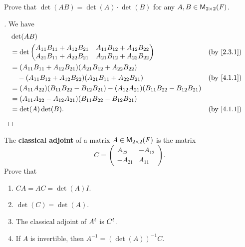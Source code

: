 \begin{ex}\label{ex:4.1.9}
	Prove that \(\det(AB) = \det(A) \cdot \det(B)\) for any \(A, B \in \mathsf{M}_{{2} \times 2}({\mathit{F}})\).
\end{ex}

\begin{proof}[]
	We have
	\begin{align*}
		 & \det(AB)                                                                                                                        \\
		 & = \det\begin{pmatrix}
			         A_{1 1} B_{1 1} + A_{1 2} B_{2 1} & A_{1 1} B_{1 2} + A_{1 2} B_{2 2} \\
			         A_{2 1} B_{1 1} + A_{2 2} B_{2 1} & A_{2 1} B_{1 2} + A_{2 2} B_{2 2}
		         \end{pmatrix}                                        &  & \by{2.3.1}                                                     \\
		 & = (A_{1 1} B_{1 1} + A_{1 2} B_{2 1}) (A_{2 1} B_{1 2} + A_{2 2} B_{2 2})                                                       \\
		 & \quad - (A_{1 1} B_{1 2} + A_{1 2} B_{2 2}) (A_{2 1} B_{1 1} + A_{2 2} B_{2 1})                                 &  & \by{4.1.1} \\
		 & = (A_{1 1} A_{2 2}) (B_{1 1} B_{2 2} - B_{1 2} B_{2 1}) - (A_{1 2} A_{2 1}) (B_{1 1} B_{2 2} - B_{1 2} B_{2 1})                 \\
		 & = (A_{1 1} A_{2 2} - A_{1 2} A_{2 1}) (B_{1 1} B_{2 2} - B_{1 2} B_{2 1})                                                       \\
		 & = \det(A) \det(B).                                                                                              &  & \by{4.1.1}
	\end{align*}
\end{proof}

\begin{ex}\label{ex:4.1.10}
	The \textbf{classical adjoint} of a matrix \(A \in \mathsf{M}_{{2} \times 2}({\mathit{F}})\) is the matrix
	\[
		C = \begin{pmatrix}
			A_{2 2}  & -A_{1 2} \\
			-A_{2 1} & A_{1 1}
		\end{pmatrix}.
	\]
	Prove that
	\begin{enumerate}
		\item \(CA = AC = \det(A) I\).
		\item \(\det(C) = \det(A)\).
		\item The classical adjoint of \({A}^{t}\) is \({C}^{t}\).
		\item If \(A\) is invertible, then \(A^{-1} = (\det(A))^{-1} C\).
	\end{enumerate}
\end{ex}

